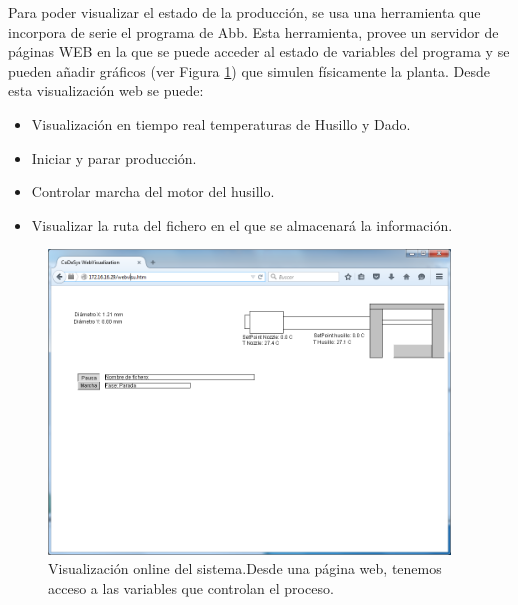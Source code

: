 Para poder visualizar el estado de la producción, se usa una herramienta que incorpora de serie el programa de Abb. Esta herramienta, provee un servidor de páginas WEB en la que se puede acceder al estado de variables del programa y se pueden añadir gráficos (ver Figura \ref{fig:plc_visu_web}) que simulen físicamente la planta. Desde esta visualización web se puede:

\begin{itemize}
    \item {Visualización en tiempo real temperaturas de Husillo y Dado.}
    \item {Iniciar y parar producción.}
    \item {Controlar marcha del motor del husillo.}
    \item {Visualizar la ruta del fichero en el que se almacenará la información.}
\end{itemize}

\begin{figure}[H]
    \centering
    \includegraphics[width=0.95\textwidth]{images/PLC/visu_online.png}
    \caption[Visualización online del sistema.]{Visualización online del sistema.Desde una página web, tenemos acceso a las variables que controlan el proceso.}
    \label{fig:plc_visu_web}
\end{figure}

